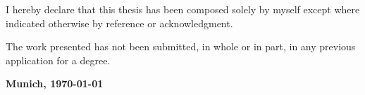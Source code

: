 

I hereby declare that this thesis has been composed solely by myself except
where indicated otherwise by reference or acknowledgment.

The work presented has not been submitted, in whole or in part, in any
previous application for a degree.

\vspace{1em}
\textbf{Munich, \today}
